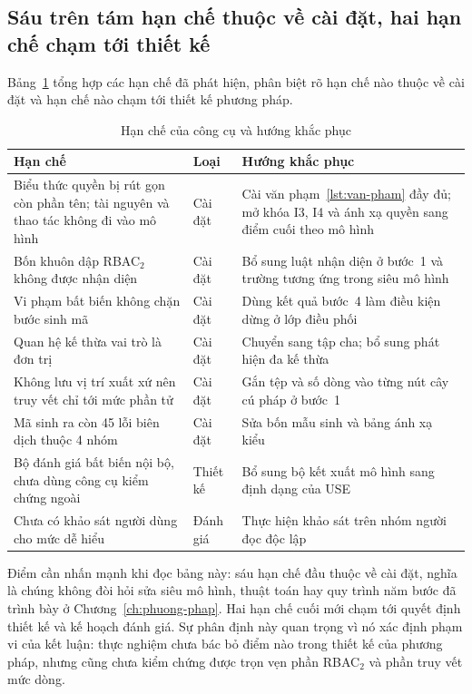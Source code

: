 \subsection{Sáu trên tám hạn chế thuộc về cài đặt, hai hạn chế chạm tới thiết kế}

Bảng~\ref{tab:han-che} tổng hợp các hạn chế đã phát hiện, phân biệt rõ hạn chế nào thuộc về cài đặt và hạn chế nào chạm tới thiết kế phương pháp.

\begin{table}[htbp]
\centering
\caption{Hạn chế của công cụ và hướng khắc phục}
\label{tab:han-che}
\small
\begin{tabularx}{\textwidth}{@{}XlX@{}}
\toprule
\textbf{Hạn chế} & \textbf{Loại} & \textbf{Hướng khắc phục} \\
\midrule
Biểu thức quyền bị rút gọn còn phần tên; tài nguyên và thao tác không đi vào mô hình & Cài đặt & Cài văn phạm~\ref{lst:van-pham} đầy đủ; mở khóa I3, I4 và ánh xạ quyền sang điểm cuối theo mô hình \\
Bốn khuôn dập RBAC$_2$ không được nhận diện & Cài đặt & Bổ sung luật nhận diện ở bước~1 và trường tương ứng trong siêu mô hình \\
Vi phạm bất biến không chặn bước sinh mã & Cài đặt & Dùng kết quả bước~4 làm điều kiện dừng ở lớp điều phối \\
Quan hệ kế thừa vai trò là đơn trị & Cài đặt & Chuyển sang tập cha; bổ sung phát hiện đa kế thừa \\
Không lưu vị trí xuất xứ nên truy vết chỉ tới mức phần tử & Cài đặt & Gắn tệp và số dòng vào từng nút cây cú pháp ở bước~1 \\
Mã sinh ra còn 45 lỗi biên dịch thuộc 4 nhóm & Cài đặt & Sửa bốn mẫu sinh và bảng ánh xạ kiểu \\
Bộ đánh giá bất biến nội bộ, chưa dùng công cụ kiểm chứng ngoài & Thiết kế & Bổ sung bộ kết xuất mô hình sang định dạng của USE \citep{gogolla2007} \\
Chưa có khảo sát người dùng cho mức dễ hiểu & Đánh giá & Thực hiện khảo sát trên nhóm người đọc độc lập \\
\bottomrule
\end{tabularx}
\end{table}

Điểm cần nhấn mạnh khi đọc bảng này: sáu hạn chế đầu thuộc về cài đặt, nghĩa là chúng không đòi hỏi sửa siêu mô hình, thuật toán hay quy trình năm bước đã trình bày ở Chương~\ref{ch:phuong-phap}. Hai hạn chế cuối mới chạm tới quyết định thiết kế và kế hoạch đánh giá. Sự phân định này quan trọng vì nó xác định phạm vi của kết luận: thực nghiệm chưa bác bỏ điểm nào trong thiết kế của phương pháp, nhưng cũng chưa kiểm chứng được trọn vẹn phần RBAC$_2$ và phần truy vết mức dòng.

